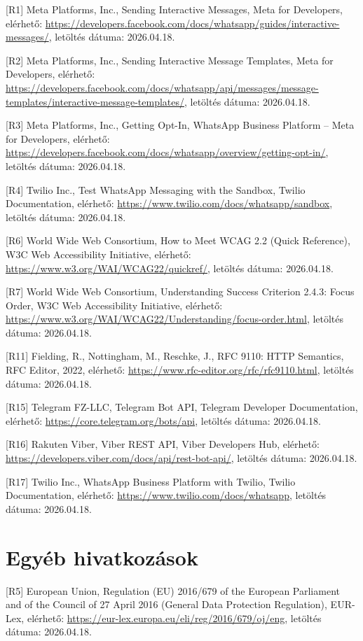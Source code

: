 \begin{sloppypar}
[R1] Meta Platforms, Inc., Sending Interactive Messages, Meta for Developers, elérhető: \url{https://developers.facebook.com/docs/whatsapp/guides/interactive-messages/}, letöltés dátuma: 2026.04.18.

[R2] Meta Platforms, Inc., Sending Interactive Message Templates, Meta for Developers, elérhető: \url{https://developers.facebook.com/docs/whatsapp/api/messages/message-templates/interactive-message-templates/}, letöltés dátuma: 2026.04.18.

[R3] Meta Platforms, Inc., Getting Opt-In, WhatsApp Business Platform -- Meta for Developers, elérhető: \url{https://developers.facebook.com/docs/whatsapp/overview/getting-opt-in/}, letöltés dátuma: 2026.04.18.

[R4] Twilio Inc., Test WhatsApp Messaging with the Sandbox, Twilio Documentation, elérhető: \url{https://www.twilio.com/docs/whatsapp/sandbox}, letöltés dátuma: 2026.04.18.

[R6] World Wide Web Consortium, How to Meet WCAG 2.2 (Quick Reference), W3C Web Accessibility Initiative, elérhető: \url{https://www.w3.org/WAI/WCAG22/quickref/}, letöltés dátuma: 2026.04.18.

[R7] World Wide Web Consortium, Understanding Success Criterion 2.4.3: Focus Order, W3C Web Accessibility Initiative, elérhető: \url{https://www.w3.org/WAI/WCAG22/Understanding/focus-order.html}, letöltés dátuma: 2026.04.18.

[R11] Fielding, R., Nottingham, M., Reschke, J., RFC 9110: HTTP Semantics, RFC Editor, 2022, elérhető: \url{https://www.rfc-editor.org/rfc/rfc9110.html}, letöltés dátuma: 2026.04.18.

[R15] Telegram FZ-LLC, Telegram Bot API, Telegram Developer Documentation, elérhető: \url{https://core.telegram.org/bots/api}, letöltés dátuma: 2026.04.18.

[R16] Rakuten Viber, Viber REST API, Viber Developers Hub, elérhető: \url{https://developers.viber.com/docs/api/rest-bot-api/}, letöltés dátuma: 2026.04.18.

[R17] Twilio Inc., WhatsApp Business Platform with Twilio, Twilio Documentation, elérhető: \url{https://www.twilio.com/docs/whatsapp}, letöltés dátuma: 2026.04.18.

\section{Egyéb hivatkozások}

[R5] European Union, Regulation (EU) 2016/679 of the European Parliament and of the Council of 27 April 2016 (General Data Protection Regulation), EUR-Lex, elérhető: \url{https://eur-lex.europa.eu/eli/reg/2016/679/oj/eng}, letöltés dátuma: 2026.04.18.
\end{sloppypar}